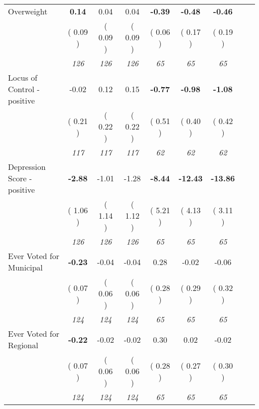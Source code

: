 \begin{tabular}{l c c c c c c c c}
Overweight & \textbf{      0.14 } &      0.04 &      0.04 & \textbf{     -0.39 } & \textbf{     -0.48 } & \textbf{     -0.46 } \\
& (     0.09 ) & (     0.09 ) & (     0.09 ) & (     0.06 ) & (     0.17 ) & (     0.19 ) \\
& \textit{ 126 } & \textit{ 126 } & \textit{ 126 } & \textit{ 65 } & \textit{ 65 } & \textit{ 65 } \\
Locus of Control - positive &     -0.02 &      0.12 &      0.15 & \textbf{     -0.77 } & \textbf{     -0.98 } & \textbf{     -1.08 } \\
& (     0.21 ) & (     0.22 ) & (     0.22 ) & (     0.51 ) & (     0.40 ) & (     0.42 ) \\
& \textit{ 117 } & \textit{ 117 } & \textit{ 117 } & \textit{ 62 } & \textit{ 62 } & \textit{ 62 } \\
Depression Score - positive & \textbf{     -2.88 } &     -1.01 &     -1.28 & \textbf{     -8.44 } & \textbf{    -12.43 } & \textbf{    -13.86 } \\
& (     1.06 ) & (     1.14 ) & (     1.12 ) & (     5.21 ) & (     4.13 ) & (     3.11 ) \\
& \textit{ 126 } & \textit{ 126 } & \textit{ 126 } & \textit{ 65 } & \textit{ 65 } & \textit{ 65 } \\
Ever Voted for Municipal & \textbf{     -0.23 } &     -0.04 &     -0.04 &      0.28 &     -0.02 &     -0.06 \\
& (     0.07 ) & (     0.06 ) & (     0.06 ) & (     0.28 ) & (     0.29 ) & (     0.32 ) \\
& \textit{ 124 } & \textit{ 124 } & \textit{ 124 } & \textit{ 65 } & \textit{ 65 } & \textit{ 65 } \\
Ever Voted for Regional & \textbf{     -0.22 } &     -0.02 &     -0.02 &      0.30 &      0.02 &     -0.02 \\
& (     0.07 ) & (     0.06 ) & (     0.06 ) & (     0.28 ) & (     0.27 ) & (     0.30 ) \\
& \textit{ 124 } & \textit{ 124 } & \textit{ 124 } & \textit{ 65 } & \textit{ 65 } & \textit{ 65 } \\
\bottomrule
\end{tabular}
